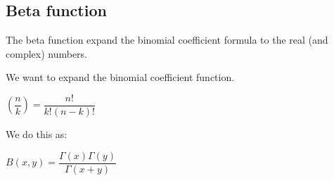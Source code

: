 
\subsection{Beta function}

The beta function expand the binomial coefficient formula to the real (and complex) numbers.

We want to expand the binomial coefficient function.

\((\dfrac{n}{k})=\dfrac{n!}{k!(n-k)!}\)

We do this as:

\(B(x, y)=\dfrac{\Gamma(x)\Gamma(y)}{\Gamma(x+y)}\)

